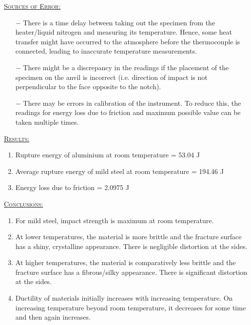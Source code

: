 \documentclass[a4paper, 11pt]{article}
\begin{document}
\underline{\textsc{Sources of Error:}}
\begin{itemize}
	\itemsep0em
	\item[$-$] There is a time delay between taking out the specimen from the heater/liquid nitrogen and measuring its temperature. Hence, some heat transfer might have occurred to the atmosphere before the thermocouple is connected, leading to inaccurate temperature measurements.
	\item[$-$] There might be a discrepancy in the readings if the placement of the specimen on the anvil is incorrect (i.e. direction of impact is not perpendicular to the face opposite to the notch).
	\item[$-$] There may be errors in calibration of the instrument. To reduce this, the readings for energy loss due to friction and maximum possible value can be taken multiple times.
\end{itemize}

\underline{\textsc{Results:}}
	\begin{enumerate}[label=\roman*)]
		\itemsep0em
		\item Rupture energy of aluminium at room temperature = 53.04 J
		\item Average rupture energy of mild steel at room temperature = 194.46 J
		\item Energy loss due to friction = 2.0975 J
	\end{enumerate}
\underline{\textsc{Conclusions:}}
\begin{enumerate}[label=\roman*)]
		\itemsep0em
		\item For mild steel, impact strength is maximum at room temperature.
		\item At lower temperatures, the material is more brittle and the fracture surface has a shiny, crystalline appearance. There is negligible distortion at the sides.
		\item At higher temperatures, the material is comparatively less brittle and the fracture surface has a fibrous/silky appearance. There is significant distortion at the sides.
		\item Ductility of materials initially increases with increasing temperature. On increasing temperature beyond room temperature, it decreases for some time and then again increases.
	\end{enumerate}
\end{document}
